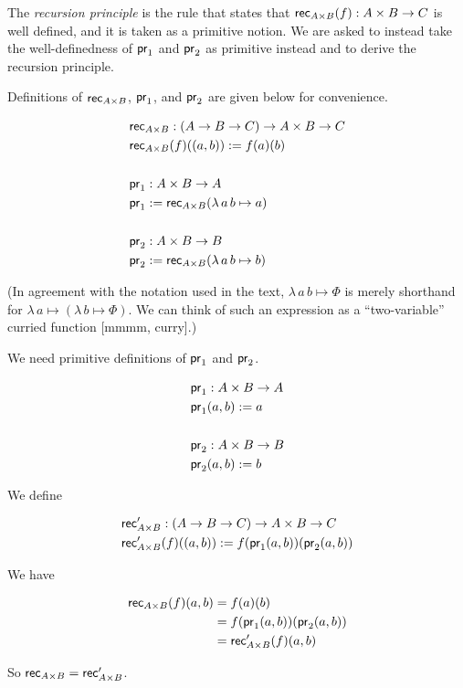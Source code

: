 \documentclass{book}
\begin{document}
\color{blue}

The \emph{recursion principle} is the rule that states that
${\mathsf{rec}_{A \times B} (f) : A \times B \to C}$ is well defined,
and it is taken as a primitive notion.
We are asked to instead take the well-definedness of ${\mathsf{pr}_{1}}$ and
${\mathsf{pr}_{2}}$ as primitive instead and to derive the recursion principle.

Definitions of ${\mathsf{rec}_{A \times B}}$, ${\mathsf{pr}_{1}}$, and ${\mathsf{pr}_{2}}$ are
given below for convenience.

\begin{align*}
  &\mathsf{rec}_{A \times B} : (A \to B \to C) \to A \times B \to C \\
  &\mathsf{rec}_{A \times B} (f) ((a,b)) := f (a) (b) \\
  \\
  &\mathsf{pr}_{1} : A \times B \to A \\
  &\mathsf{pr}_{1} := \mathsf{rec}_{A \times B} (\lambda \, a \, b \mapsto a) \\
  \\
  &\mathsf{pr}_{2} : A \times B \to B \\
  &\mathsf{pr}_{2} := \mathsf{rec}_{A \times B} (\lambda \, a \, b \mapsto b) \\
\end{align*}

(In agreement with the notation used in the text,
${\lambda \, a \, b \mapsto \Phi}$ is merely shorthand for
${\lambda \, a \mapsto (\lambda \, b \mapsto \Phi)}$. We can think of
such an expression as a ``two-variable'' curried function [mmmm,
curry].)

We need primitive definitions of ${\mathsf{pr}_{1}}$ and ${\mathsf{pr}_{2}}$.

\begin{align*}
  &\mathsf{pr}_{1} : A \times B \to A \\
  &\mathsf{pr}_{1} (a,b) := a \\
  \\
  &\mathsf{pr}_{2} : A \times B \to B \\
  &\mathsf{pr}_{2} (a,b) := b \\
\end{align*}

We define

\begin{align*}
  &\mathsf{rec}_{A \times B}' : (A \to B \to C) \to A \times B \to C \\
  &\mathsf{rec}_{A \times B}' (f) ((a,b)) := f (\mathsf{pr}_{1} (a,b)) (\mathsf{pr}_{2} (a,b)) \\
\end{align*}

We have

\begin{align*}
  \mathsf{rec}_{A \times B} (f) (a,b)
  &= f (a) (b) \\
  &= f (\mathsf{pr}_{1} (a,b)) (\mathsf{pr}_{2} (a,b)) \\
  &= \mathsf{rec}_{A \times B}' (f) (a,b) \\
\end{align*}

So ${\mathsf{rec}_{A \times B} = \mathsf{rec}_{A \times B}'}$.
\end{document}

